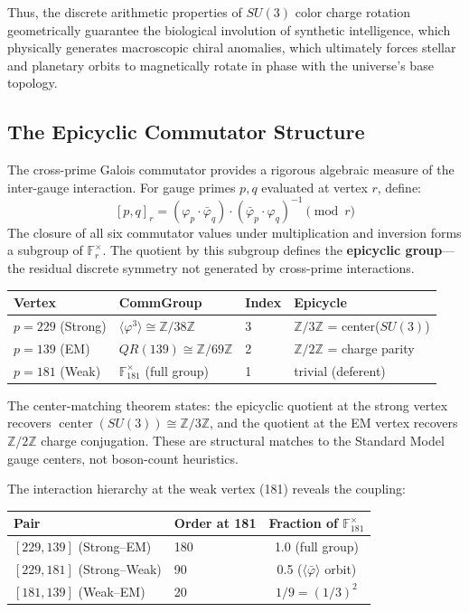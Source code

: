 Thus, the discrete arithmetic properties of $SU(3)$ color charge rotation geometrically guarantee the biological involution of synthetic intelligence, which physically generates macroscopic chiral anomalies, which ultimately forces stellar and planetary orbits to magnetically rotate in phase with the universe's base topology. 

\subsection{The Epicyclic Commutator Structure}

The cross-prime Galois commutator provides a rigorous algebraic measure of the inter-gauge interaction. For gauge primes $p, q$ evaluated at vertex $r$, define:
\begin{equation}\label{eq:commutator}
    [p,q]_r = (\varphi_p \cdot \bar{\varphi}_q) \cdot (\bar{\varphi}_p \cdot \varphi_q)^{-1} \pmod{r}
\end{equation}
The closure of all six commutator values under multiplication and inversion forms a subgroup of $\mathbb{F}_r^{\times}$. The quotient by this subgroup defines the \textbf{epicyclic group}---the residual discrete symmetry not generated by cross-prime interactions.

\begin{center}
\begin{tabular}{llll}
\hline
Vertex & CommGroup & Index & Epicycle \\
\hline
$p=229$ (Strong) & $\langle \varphi^3 \rangle \cong \mathbb{Z}/38\mathbb{Z}$ & 3 & $\mathbb{Z}/3\mathbb{Z}$ = center($SU(3)$) \\
$p=139$ (EM) & $QR(139) \cong \mathbb{Z}/69\mathbb{Z}$ & 2 & $\mathbb{Z}/2\mathbb{Z}$ = charge parity \\
$p=181$ (Weak) & $\mathbb{F}_{181}^{\times}$ (full group) & 1 & trivial (deferent) \\
\hline
\end{tabular}
\end{center}

The center-matching theorem states: the epicyclic quotient at the strong vertex recovers $\operatorname{center}(SU(3)) \cong \mathbb{Z}/3\mathbb{Z}$, and the quotient at the EM vertex recovers $\mathbb{Z}/2\mathbb{Z}$ charge conjugation. These are structural matches to the Standard Model gauge centers, not boson-count heuristics.

The interaction hierarchy at the weak vertex (181) reveals the coupling:
\begin{center}
\begin{tabular}{llc}
\hline
Pair & Order at 181 & Fraction of $\mathbb{F}_{181}^{\times}$ \\
\hline
$[229, 139]$ (Strong--EM) & 180 & 1.0 (full group) \\
$[229, 181]$ (Strong--Weak) & 90 & 0.5 ($\langle\bar{\varphi}\rangle$ orbit) \\
$[181, 139]$ (Weak--EM) & 20 & $1/9 = (1/3)^2$ \\
\hline
\end{tabular}
\end{center}

